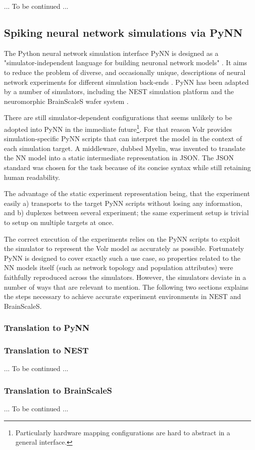 \documentclass{report.tex}{subfiles}
\begin{document}

... To be continued ...

\subsection{Spiking neural network simulations via PyNN} \label{sec:volr-pynn}
The Python neural network simulation interface PyNN is designed as a
"simulator-independent language for building neuronal network models"
\autocite{PyNN2018}.
It aims to reduce the problem of diverse, and occasionally unique, descriptions
of neural network experiments for different simulation back-ends \autocite{Davison2009}.
PyNN has been adapted by a number of simulators, including the NEST simulation
platform and the neuromorphic BrainScaleS wafer system
\autocite{Davison2009, Helias2012, Schmitt2017}.

There are still simulator-dependent configurations that seems unlikely to be
adopted into PyNN in the immediate future\footnote{
  Particularly hardware mapping configurations are hard to abstract in a general
  interface.
}.
For that reason Volr provides simulation-specific PyNN scripts that can
interpret the model in the context of each simulation target.
A middleware, dubbed \gls{Myelin}, was invented to translate the \gls{NN} model
into a static intermediate representation in JSON.
The JSON standard was chosen for the task because of its concise syntax while
still retaining human readability.

The advantage of the static experiment representation being, that the experiment
easily a) transports to the target PyNN scripts without losing any information,
and b) duplexes between several experiment; the same experiment setup is
trivial to setup on multiple targets at once.

The correct execution of the experiments relies on the PyNN scripts to exploit
the simulator to represent the Volr model as accurately as possible.
Fortunately PyNN is designed to cover exactly such a use case, so properties
related to the \gls{NN} models itself (such as network topology and population
attributes) were faithfully reproduced across the simulators.
However, the simulators deviate in a number of ways that are relevant to
mention.
The following two sections explains the steps necessary to achieve accurate
experiment environments in \gls{NEST} and \gls{BrainScaleS}.

\subsubsection{Translation to PyNN} \label{sec:volr-translation}

\subsubsection{Translation to NEST} \label{sec:volr-NEST}
... To be continued ...
\subsubsection{Translation to BrainScaleS} \label{sec:volr-BrainScaleS}
... To be continued ...
\end{document}
